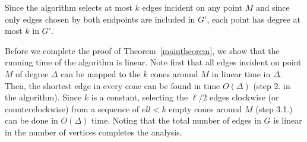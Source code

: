 \documentclass{stacs_proc}
\theoremstyle{plain}\newtheorem{satz}[thm]{Satz}
\begin{document}
Since the algorithm selects at most $k$ edges incident on any point
$M$ and since only edges chosen by both endpoints are included in $G'$,
each point has degree at most $k$ in $G'$.

Before we complete the proof of Theorem~\ref{maintheorem}, we show that the
running time of the algorithm is linear. Note first that all edges incident
on point $M$ of degree $\Delta$ can be mapped to the $k$ cones around $M$ in
linear time in $\Delta$. Then, the shortest edge in every cone can be found in
time $O(\Delta)$ (step 2. in the algorithm). Since $k$ is a constant, selecting
the $\ell/2$ edges clockwise (or counterclockwise) from a sequence of $ell < k$
empty cones around $M$ (step 3.1.) can be done in $O(\Delta)$ time. Noting that
the total number of edges in $G$ is linear in the number of vertices completes
the analysis.
\end{document}
